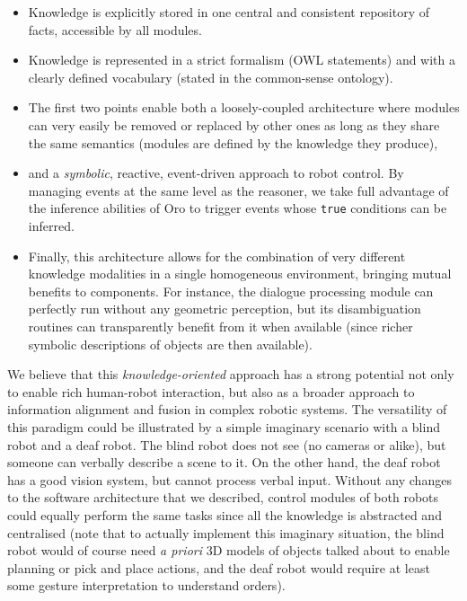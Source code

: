 \documentclass[letterpaper, 10 pt, conference]{ieeeconf}  %
\begin{document}
\begin{itemize}
    
    \item{Knowledge is explicitly stored in one central and consistent
    repository of facts, accessible by all modules.} 

    \item{Knowledge is represented in a strict formalism (OWL statements) and
    with a clearly defined vocabulary (stated in the common-sense ontology).}

    \item{The first two points enable both a loosely-coupled architecture where
    modules can very easily be removed or replaced by other ones as long as
    they share the same semantics (modules are defined by the knowledge they
    produce),} 

    \item{and a \emph{symbolic}, reactive, event-driven approach to robot control.
    By managing events at the same level as the reasoner, we take full
    advantage of the inference abilities of {\sc Oro} to trigger events whose
    \texttt{true} conditions can be inferred.} 

    \item{Finally, this architecture allows for the combination of very
    different knowledge modalities in a single homogeneous environment,
    bringing mutual benefits to components. For instance, the dialogue
    processing module can perfectly run without any geometric
    perception, but its disambiguation routines can transparently
    benefit from it when available (since richer symbolic descriptions of
    objects are then available).}

\end{itemize}

We believe that this \emph{knowledge-oriented} approach has a strong potential
not only to enable rich human-robot interaction, but also as a broader approach
to information alignment and fusion in complex robotic systems.  The
versatility of this paradigm could be illustrated by a simple imaginary
scenario with a blind robot and a deaf robot. The blind robot does not see (no
cameras or alike), but someone can verbally describe a scene to it. On the
other hand, the deaf robot has a good vision system, but cannot process verbal
input.  Without any changes to the software architecture that we described,
control modules of both robots could equally perform the same tasks since all
the knowledge is abstracted and centralised (note that to actually implement
this imaginary situation, the blind robot would of course need \textit{a
priori} 3D models of objects talked about to enable planning or pick and place
actions, and the deaf robot would require at least some gesture interpretation
to understand orders).
\end{document}
